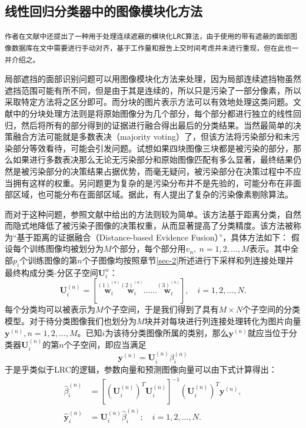 \documentclass[UTF8]{ctexart}
\begin{document}
\subsection{线性回归分类器中的图像模块化方法}
\texttt{作者在文献\cite{5506092}中还提出了一种用于处理连续遮蔽的模块化LRC算法，由于使用的带有遮蔽的面部图像数据库在文中需要进行手动对齐，基于工作量和报告上交时间考虑并未进行重现，但在此也一并介绍之。}\par
局部遮挡的面部识别问题可以用图像模块化方法来处理，因为局部连续遮挡物虽然遮挡范围可能有所不同，但是由于其是连续的，所以只是污染了一部分像素，所以采取特定方法将之区分即可。而分块的图片表示方法可以有效地处理这类问题。文献\cite{5506092}中的分块处理方法则是将原始图像分为几个部分，每个部分都进行独立的线性回归，然后将所有的部分得到的证据进行融合得出最后的分类结果。当然最简单的决策融合方法可能就是多数表决（majority voting）\cite{323814}了，但该方法将污染部分和未污染部分等效看待，可能会引发问题。试想如果四块图像三块都是被污染的部分，那么如果进行多数表决那么无论无污染部分和原始图像匹配有多么显著，最终结果仍然是被污染部分的决策结果占据优势，而毫无疑问，被污染部分在决策过程中不应当拥有这样的权重。另问题更为复杂的是污染分布并不是先验的，可能分布在非面部区域，也可能分布在面部区域。据此，有人提出了复杂的污染像素剔除算法\cite{1580480}。\par
而对于这种问题，参照文献\cite{5506092}中给出的方法则较为简单。该方法基于距离分类，自然而隐式地降低了被污染子图像的决策权重，从而显著提高了分类精度。该方法被称为“基于距离的证据融合（Distance-based Evidence Fusion）”，具体方法如下：
假设每个训练图像均被划分为\(M\)个部分，每个部分用\(v_n,\ n=1,2,\dots,M\)表示。其中全部\(p_i\)个训练图像的第\(n\)个子图像均按照章节\ref{sec-2}所述进行下采样和列连接处理并最终构成分类-分区子空间\(\mathbf{U}^{n}_i\)：
\begin{equation}
    \mathbf{U}^{(n)}_i=[\stackrel{(1)^{(n)}}{\mathbf{w}_i}\stackrel{(2)^{(n)}}{\mathbf{w}_i}\ldots\ldots\stackrel{(3)^{(n)}}{\mathbf{w}_i}],\quad i=1,2,\dots,N.
\end{equation}
每个分类均可以被表示为\(M\)个子空间，于是我们得到了具有\(M\times N\)个子空间的分类模型。对于待分类图像我们也划分为\(M\)块并对每块进行列连接处理转化为图片向量\(\mathbf{y}^{(n)},n=1,2,\dots,M\)。已知\(i\)为该待分类图像所属的类别，那么\(\mathbf{y}^{(n)}\)就应当位于分类器\(\mathbf{U}^{(n)}_i\)的第\(n\)个子空间，即应当满足
\begin{equation}
    \mathbf{y}^{(n)}=\mathbf{U}^{(n)}_i\beta^{(n)}_i
\end{equation}
于是乎类似于LRC的逻辑，参数向量和预测图像向量可以由下式计算得出：
\begin{align}
    \hat{\beta}^{(n)}_i&={[(\mathbf{U}^{(n)}_i)^T\mathbf{U}^{(n)}_i]}^{-1}(\mathbf{U}^{(n)}_i)^T\mathbf{y}^{(n)},\\
    \hat{\mathbf{y}}^{(n)}_i&=\mathbf{U}^{(n)}_i{\hat{\beta}}^{(n)}_i;\quad i=1,2,\dots,N.
\end{align}
\end{document}
